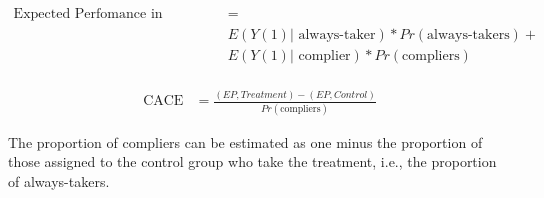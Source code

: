 \documentclass[11pt,notitlepage]{article}\usepackage[]{graphicx}\usepackage[]{color}
\begin{document}
\begin{enumerate}[a)]
\begin{align*}
\text{Expected Perfomance in Treatment (EP, Treatment)} &= \\
&E(Y(1)|\text{ always-taker})*Pr(\text{always-takers}) + \\
&E(Y(1)|\text{ complier})*Pr(\text{compliers})\\
\end{align*}

\begin{align*}
\text{CACE} &= \frac{(EP, Treatment) - (EP, Control)}{Pr(\text{compliers})}
\end{align*}

The proportion of compliers can be estimated as one minus the proportion of those assigned to the control group who take the treatment, i.e., the proportion of always-takers.

\end{enumerate}
\end{document}
